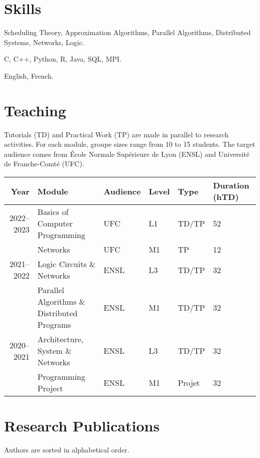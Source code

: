 \documentclass[12pt]{article}
\newcounter{cvitems}
\newcommand{\cvitem}[2]{\item[#1] #2}
\begin{document}
\section*{Skills}

\begin{cvitems}
  \cvitem{Academic}{Scheduling Theory, Approximation Algorithms, Parallel Algorithms, Distributed Systems, Networks, Logic.}

  \cvitem{Technical}{C, C++, Python, R, Java, SQL, MPI.}

  \cvitem{Language}{English, French.}
\end{cvitems}

\section*{Teaching}

Tutorials (TD) and Practical Work (TP) are made in parallel to research activities.  
For each module, groupe sizes range from 10 to 15 students.  
The target audience comes from École Normale Supérieure de Lyon (ENSL) and Université de
Franche-Comté (UFC).

\begin{center}
  \footnotesize
  \begin{tabularx}{\textwidth}{rXllll}
    \toprule
    Year & Module & Audience & Level & Type & Duration (hTD) \tabularnewline
    \midrule
    2022--2023 & Basics of Computer Programming & UFC & L1 & TD/TP & 52 \tabularnewline
    & Networks & UFC & M1 & TP & 12 \tabularnewline
    \midrule
    2021--2022 & Logic Circuits \& Networks & ENSL & L3 & TD/TP & 32 \tabularnewline
    & Parallel Algorithms \& Distributed Programs & ENSL & M1 & TD/TP & 32 \tabularnewline
    \midrule
    2020--2021 & Architecture, System \& Networks & ENSL & L3 & TD/TP & 32 \tabularnewline
    & Programming Project & ENSL & M1 & Projet & 32 \tabularnewline
    \bottomrule
  \end{tabularx}
\end{center}

\section*{Research Publications}

Authors are sorted in alphabetical order.

\nocite{*}

\newcommand{\showbib}[1]{%
  \begin{otherlanguage}{english}
    \printbibliography[heading=none,keyword={#1}]
  \end{otherlanguage}}
\end{document}
